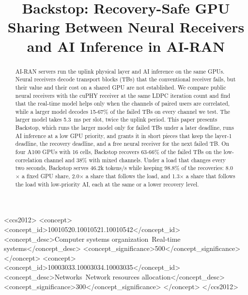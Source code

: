 \documentclass[acmsmall,screen,review,anonymous]{acmart}
\newcommand{\sys}{Backstop\xspace}
\begin{document}
\title[Backstop: Recovery-Safe GPU Sharing in AI-RAN]{Backstop: Recovery-Safe GPU Sharing Between
Neural Receivers and AI Inference in AI-RAN}


\begin{CCSXML}
<ccs2012>
 <concept>
  <concept_id>10010520.10010521.10010542</concept_id>
  <concept_desc>Computer systems organization~Real-time systems</concept_desc>
  <concept_significance>500</concept_significance>
 </concept>
 <concept>
  <concept_id>10003033.10003034.10003035</concept_id>
  <concept_desc>Networks~Network resources allocation</concept_desc>
  <concept_significance>300</concept_significance>
 </concept>
</ccs2012>
\end{CCSXML}



\begin{abstract}
AI-RAN servers run the uplink physical layer and AI inference on the same GPUs. Neural receivers decode
transport blocks (TBs) that the conventional receiver fails, but their value and their cost on a shared
GPU are not established. We compare public neural receivers with the cuPHY receiver at the same LDPC
iteration count and find that the real-time model helps only when the channels of paired users are
correlated, while a larger model decodes 15-67\% of the failed TBs on every channel we test. The larger
model takes 5.3~ms per slot, twice the uplink period. This paper presents \sys, which runs the larger model
only for failed TBs under a later deadline, runs AI inference at a low GPU priority, and grants it in short
pieces that keep the layer-1 deadline, the recovery deadline, and a free neural receiver for the next failed
TB. On four A100 GPUs with 16 cells, \sys recovers 63-66\% of the failed TBs on the low-correlation channel
and 38\% with mixed channels. Under a load that changes every two seconds, \sys serves 46.2k tokens/s while
keeping 98.8\% of the recoveries: 8.0$\times$ a fixed GPU share, 2.0$\times$ a share that follows the load,
and 1.3$\times$ a share that follows the load with low-priority AI, each at the same or a lower recovery
level.
\end{abstract}
\end{document}

